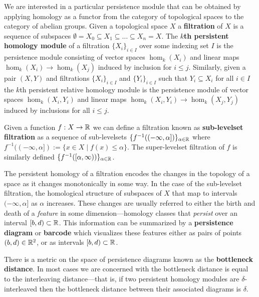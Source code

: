 
We are interested in a particular persistence module that can be obtained by applying homology as a functor from the category of topological spaces to the category of abelian groups.
Given a topological space $X$ a \textbf{filtration} of $X$ is a sequence of subspaces $\emptyset = X_0\subseteq X_1\subseteq\ldots\subseteq X_n = X$.
The \textbf{$k$th persistent homology module} of a filtration $\{X_i\}_{i\in I}$ over some indexing set $I$ is the persistence module consisting of vector spaces $\hom_k(X_i)$ and linear maps $\hom_k(X_i)\to \hom_k(X_j)$ induced by inclusion for $i\leq j$.
Similarly, given a pair $(X,Y)$ and filtrations $\{X_i\}_{i\in I}$ and $\{Y_i\}_{i\in I}$ such that $Y_i\subseteq X_i$ for all $i\in I$ the $k$th persistent relative homology module is the persistence module of vector spaces $\hom_k(X_i, Y_i)$ and linear maps $\hom_k(X_i, Y_i)\to\hom_k(X_j, Y_j)$ induced by inclusions for all $i\leq j$.

Given a function $f: X\to \mathbb{R}$ we can define a filtration known as \textbf{sub-levelset filtration} as a sequence of sub-levelsets $\{f^{-1}((-\infty, \alpha])\}_{\alpha\in\mathbb{R}}$ where $f^{-1}((-\infty, \alpha]) := \{x\in X\mid f(x)\leq\alpha\}$.
The super-levelset filtration of $f$ is similarly defined $\{f^{-1}([\alpha,\infty))\}_{\alpha\in\mathbb{R}}$.

The persistent homology of a filtration encodes the changes in the topology of a space as it changes monotonically in some way.
In the case of the sub-levelset filtration, the homological structure of subspaces of $X$ that map to intervals $(-\infty,\alpha]$ as $\alpha$ increases.
These changes are usually referred to either the birth and death of a \emph{feature} in some dimension---homology classes that \emph{persist} over an interval $[b, d)\subset\mathbb{R}$.
This information can be summarized by a \textbf{persistence diagram} or \textbf{barcode} which visualizes these features either as pairs of points $(b, d)\in\mathbb{R}^2$, or as intervals $[b, d)\subset\mathbb{R}$.

There is a metric on the space of persistence diagrams known as the \textbf{bottleneck distance}.
In most cases we are concerned with the bottleneck distance is equal to the interleaving distance---that is, if two persistent homology modules are $\delta$-interleaved then the bottleneck distance between their associated diagrams is $\delta$.
